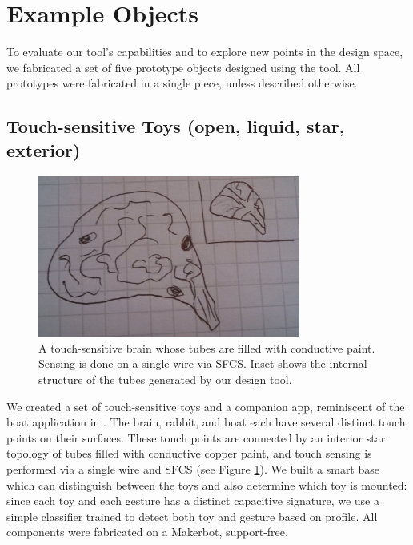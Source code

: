 \section{Example Objects}

To evaluate our tool's capabilities and to explore new points in the design space, we fabricated a set of five prototype objects designed using the tool.  All prototypes were fabricated in a single piece, unless described otherwise.

 


\subsection{Touch-sensitive Toys (open, liquid, star, exterior)}

\begin{figure}[h]
\centering
    \includegraphics[width=3.4in]{figures/placeholder/brain.jpg}
\caption{A touch-sensitive brain whose tubes are filled with conductive paint.  Sensing is done on a single wire via SFCS.  Inset shows the internal structure of the tubes generated by our design tool.}

\label{fig:toys}
\end{figure}


We created a set of touch-sensitive toys and a companion app, reminiscent of the boat application in \cite{Harrison-acoustic}.  The brain, rabbit, and boat each have several distinct touch points on their surfaces.  These touch points are connected by an interior star topology of tubes filled with conductive copper paint, and touch sensing is performed via a single wire and SFCS (see Figure \ref{fig:toys}).  We built a smart base which can distinguish between the toys and also determine which toy is mounted: since each toy and each gesture has a distinct capacitive signature, we use a simple classifier trained to detect both toy and gesture based on profile.  All components were fabricated on a Makerbot, support-free.

